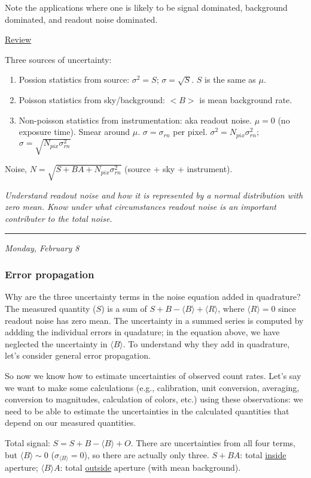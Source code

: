 \documentclass[12pt]{article}
\newcommand{\mynotes}[1]{\textcolor{myBlue}{#1}}
\newcommand{\test}[1]{%
    \begin{center}
        {\parbox{0.9\textwidth}{\textit{\small#1}}}
    \end{center}}
\newcommand{\mydate}[1]{
    \begin{flushright}
        \rule{\textwidth}{0.4pt} %
        \footnotesize\hfill\textit{#1}
    \end{flushright}}
\begin{document}
Note the applications where one is likely to be signal dominated,
background dominated, and readout noise dominated.

\mynotes{{\large\underline{Review}}}

Three sources of uncertainty:
\begin{enumerate}
    \item Possion statistics from source: $\sigma^{2} = S$;
        $\sigma = \sqrt{S}$. $S$ is the same as $\mu$.
    \item Poisson statistics from sky/background:
        $<B>$ is mean background rate.
    \item Non-poisson statistics from instrumentation:
        aka readout noise. $\mu=0$ (no exposure time).
        Smear around $\mu$. $\sigma = \sigma_{rn}$ per pixel.
        $\sigma^{2} = N_{pix}\sigma_{rn}^{2}$;
        $\sigma = \sqrt{N_{pix}\sigma_{rn}^{2}}$
\end{enumerate}
Noise, $N = \sqrt{S+BA+N_{pix}\sigma_{rn}^{2}}$
(source + sky + instrument).

\test{Understand readout noise and how it is represented by a normal distribution
with zero mean. Know under what circumstances readout noise is an important
contributer to the total noise.}

\mydate{Monday, February 8}
\subsubsection{Error propagation}
Why are the three uncertainty terms in the noise equation added in quadrature?
The measured quantity ($S$) is a sum of
$S + B -  \langle  B  \rangle  +  \langle  R \rangle $,
where $\langle  R  \rangle  = 0$
since readout noise has zero mean. The uncertainty in a summed series is
computed by addding the individual errors in quadature; in the equation above,
we have neglected the uncertainty in $\langle  B  \rangle$. To understand why they add in
quadrature, let's consider general error propagation.

\mynotes{So now we know how to estimate uncertainties of observed count rates.
Let's say we want to make some calculations (e.g., calibration, unit
conversion, averaging, conversion to magnitudes, calculation of
colors, etc.) using these observations: we need to be able to estimate
the uncertainties in the calculated quantities that depend on our
measured quantities.}

\mynotes{Total signal: $ S=S+B- \langle B \rangle +O $. There are uncertainties
from all four terms, but $ \langle B \rangle  \sim 0$ ($\sigma_{ \langle B
\rangle }=0$), so there are actually only three. $S+BA$: total
\underline{inside} aperture; $ \langle B \rangle A$: total \underline{outside}
aperture (with mean background).}
\end{document}
